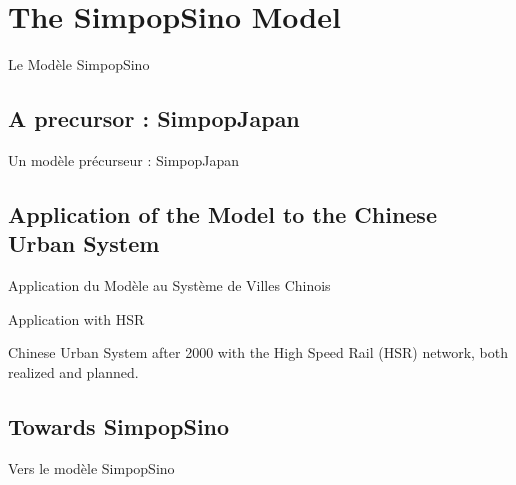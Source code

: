 





\section[The SimpopSino Model][Le Modèle SimpopSino]{The SimpopSino Model}{Le Modèle SimpopSino}



\subsection{A precursor : SimpopJapan}{Un modèle précurseur : SimpopJapan}















\subsection{Application of the Model to the Chinese Urban System}{Application du Modèle au Système de Villes Chinois}


Application with HSR

Chinese Urban System after 2000 with the High Speed Rail (HSR) network, both realized and planned.








\subsection{Towards SimpopSino}{Vers le modèle SimpopSino}








